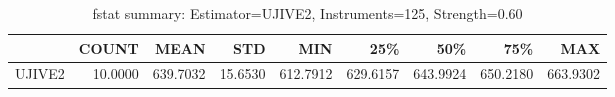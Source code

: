 \begin{table}[ht]
\centering
\caption{fstat summary: Estimator=UJIVE2, Instruments=125, Strength=0.60}
\begin{tabular}{lrrrrrrrr}
\toprule
 & COUNT & MEAN & STD & MIN & 25\% & 50\% & 75\% & MAX \\
\midrule
UJIVE2 & 10.0000 & 639.7032 & 15.6530 & 612.7912 & 629.6157 & 643.9924 & 650.2180 & 663.9302 \\
\bottomrule
\end{tabular}
\end{table}
